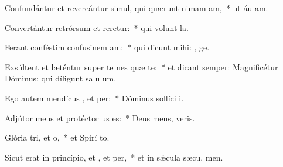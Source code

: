 \item Confundántur et revereántur simul, qui quærunt nimam am,~* ut áu am.
\item Convertántur retrórsum et reretur:~* qui volunt  la.
\item Ferant conféstim confusinem am:~* qui dicunt mihi: , ge.
\item Exsúltent et læténtur super te nes quæ te:~* et dicant semper: Magnificétur Dóminus: qui díligunt salu um.
\item Ego autem mendícus , et per:~* Dóminus sollíci  i.
\item Adjútor meus et protéctor us  es:~* Deus meus,  veris.
\item Glória tri, et o,~* et Spirí to.
\item Sicut erat in princípio, et , et per,~* et in sǽcula sæcu. men.
